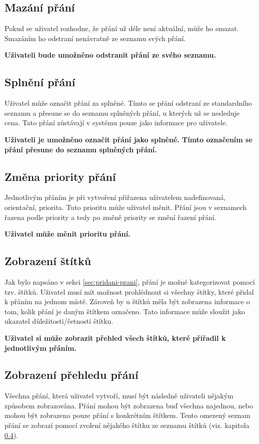 \subsection{Mazání přání}
Pokud se uživatel rozhodne, že přání už déle není aktuální, může ho smazat. Smazáním ho odstraní nenávratně ze seznamu svých přání.

\textbf{Uživateli bude umožněno odstranit přání ze svého seznamu.}

\subsection{Splnění přání}
Uživatel může označit přání za splněné. Tímto se přání odstraní ze standardního seznamu a přesune se do seznamu splněných přání, u kterých už se nesleduje cena. Tato přání zůstávají v systému pouze jako informace pro uživatele.

\textbf{Uživateli je umožněno označit přání jako splněné. Tímto označením se přání přesune do seznamu splněných přání.}

\subsection{Změna priority přání}
Jednotlivým přáním je při vytvoření přiřazena uživatelem nadefinovaná, orientační, priorita. Tuto prioritu může uživatel měnit. Přání jsou v seznamech řazena podle priority a tedy po změně priority se změní řazení přání.

\textbf{Uživatel může měnit prioritu přání.}

\subsection{Zobrazení štítků}
\label{sec:zobrazeni-stitku}
Jak bylo napsáno v sekci \ref{sec:pridani-prani}, přání je možné kategorizovat pomocí tzv. štítků. Uživatel musí mít možnost prohlédnout si všechny štítky, které přidal k přáním na jednom místě. Zároveň by u štítků měla být zobrazena informace o tom, kolik přání je daným štítkem označeno. Tato informace může sloužit jako ukazatel důležitosti/četnosti štítku.

\textbf{Uživatel si může zobrazit přehled všech štítků, které přiřadil k jednotlivým přáním.}

\subsection{Zobrazení přehledu přání}
Všechna přání, která uživatel vytvoří, musí být následně uživateli nějakým způsobem zobrazována. Přání mohou být zobrazena buď všechna najednou, nebo mohou být zobrazena pouze přání s konkrétním štítkem. Tento omezený seznam přání se zobrazí pomocí zvolení nějakého štítku ze seznamu štítků (viz. kapitola \ref{sec:zobrazeni-stitku}).

